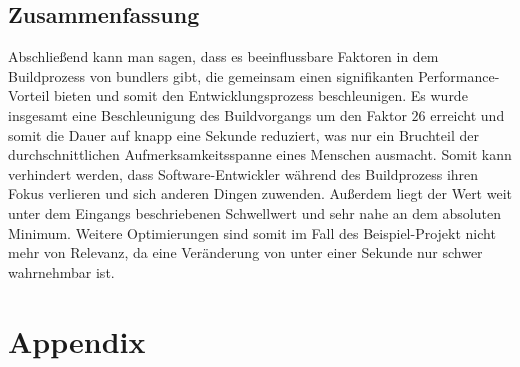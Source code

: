 \documentclass[11pt]{report}
\newcommand*{\SignatureAndDate}[1]{%
    \par\noindent\makebox[2.5in]{\hrulefill}
           \hfill\makebox[2.0in]{\hrulefill}
    \par\noindent\makebox[2.5in][l]{#1}
           \hfill\makebox[2.0in][l]{Datum}
}
\begin{document}
		\section{Zusammenfassung}
			Abschließend kann man sagen, dass es beeinflussbare Faktoren in dem Buildprozess von \Glspl{bundler} gibt, die gemeinsam einen signifikanten Performance-Vorteil bieten und somit den Entwicklungsprozess beschleunigen. Es wurde insgesamt eine Beschleunigung des Buildvorgangs um den Faktor $26$ erreicht und somit die Dauer auf knapp eine Sekunde reduziert, was nur ein Bruchteil der durchschnittlichen Aufmerksamkeitsspanne eines Menschen ausmacht. Somit kann verhindert werden, dass Software-Entwickler während des Buildprozess ihren Fokus verlieren und sich anderen Dingen zuwenden. Außerdem liegt der Wert weit unter dem Eingangs beschriebenen Schwellwert und sehr nahe an dem absoluten Minimum. Weitere Optimierungen sind somit im Fall des Beispiel-Projekt nicht mehr von Relevanz, da eine Veränderung von unter einer Sekunde nur schwer wahrnehmbar ist.
			
    \pagebreak

    \chapter{Appendix}
%    
    
\end{document}
